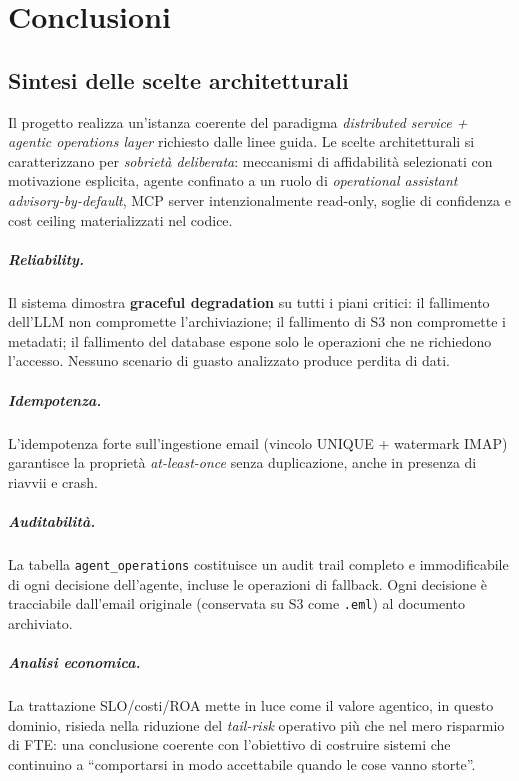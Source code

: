 \chapter{Conclusioni}
\label{chap:conclusioni}

\section{Sintesi delle scelte architetturali}
\label{sec:sintesi}

Il progetto realizza un'istanza coerente del paradigma \emph{distributed service +
agentic operations layer} richiesto dalle linee guida. Le scelte architetturali si
caratterizzano per \emph{sobriet\`a deliberata}: meccanismi di affidabilit\`a
selezionati con motivazione esplicita, agente confinato a un ruolo di
\emph{operational assistant advisory-by-default}, MCP server intenzionalmente
read-only, soglie di confidenza e cost ceiling materializzati nel codice.

\paragraph{Reliability.}
Il sistema dimostra \textbf{graceful degradation} su tutti i piani critici: il fallimento
dell'LLM non compromette l'archiviazione; il fallimento di S3 non compromette i metadati;
il fallimento del database espone solo le operazioni che ne richiedono l'accesso. Nessuno
scenario di guasto analizzato produce perdita di dati.

\paragraph{Idempotenza.}
L'idempotenza forte sull'ingestione email (vincolo UNIQUE + watermark IMAP) garantisce
la propriet\`a \emph{at-least-once} senza duplicazione, anche in presenza di riavvii
e crash.

\paragraph{Auditabilit\`a.}
La tabella \texttt{agent\_operations} costituisce un audit trail completo e immodificabile
di ogni decisione dell'agente, incluse le operazioni di fallback. Ogni decisione \`e
tracciabile dall'email originale (conservata su S3 come \texttt{.eml}) al documento
archiviato.

\paragraph{Analisi economica.}
La trattazione SLO/costi/ROA mette in luce come il valore agentico, in questo dominio,
risieda nella riduzione del \emph{tail-risk} operativo pi\`u che nel mero risparmio
di FTE: una conclusione coerente con l'obiettivo di costruire sistemi che continuino
a ``comportarsi in modo accettabile quando le cose vanno storte''.

